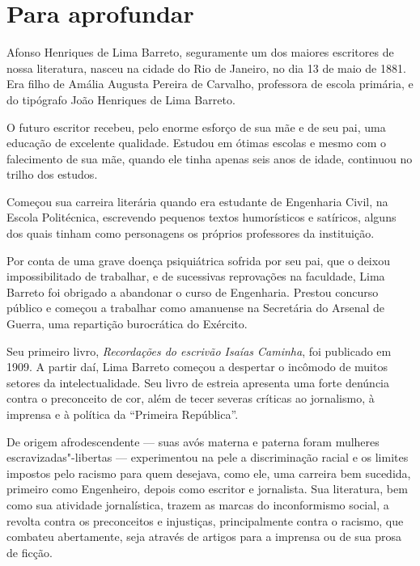 \documentclass{extarticle}
\begin{document}


\section{Para aprofundar}

Afonso Henriques de Lima Barreto, seguramente um dos maiores escritores
de nossa literatura, nasceu na cidade do Rio de Janeiro, no dia 13 de
maio de 1881. Era filho de Amália Augusta Pereira de Carvalho,
professora de escola primária, e do tipógrafo João Henriques de Lima
Barreto.

O futuro escritor recebeu, pelo enorme esforço de sua mãe e de seu pai,
uma educação de excelente qualidade. Estudou em ótimas escolas e mesmo
com o falecimento de sua mãe, quando ele tinha apenas seis anos de
idade, continuou no trilho dos estudos.

Começou sua carreira literária quando era estudante de Engenharia Civil,
na Escola Politécnica, escrevendo pequenos textos humorísticos e
satíricos, alguns dos quais tinham como personagens os próprios
professores da instituição.


Por conta de uma grave doença psiquiátrica sofrida por seu pai, que o
deixou impossibilitado de trabalhar, e de sucessivas reprovações na
faculdade, Lima Barreto foi obrigado a abandonar o curso de Engenharia.
Prestou concurso público e começou a trabalhar como amanuense na
Secretária do Arsenal de Guerra, uma repartição burocrática do Exército.

Seu primeiro livro, \emph{Recordações do escrivão Isaías Caminha}, foi
publicado em 1909. A partir daí, Lima Barreto começou a despertar o
incômodo de muitos setores da intelectualidade. Seu livro de estreia
apresenta uma forte denúncia contra o preconceito de cor, além de tecer
severas críticas ao jornalismo, à imprensa e à política da ``Primeira
República''.

De origem afrodescendente --- suas avós materna e paterna foram mulheres
escravizadas"-libertas --- experimentou na pele a discriminação racial e
os limites impostos pelo racismo para quem desejava, como ele, uma
carreira bem sucedida, primeiro como Engenheiro, depois como escritor e
jornalista. Sua literatura, bem como sua atividade jornalística, trazem
as marcas do inconformismo social, a revolta contra os preconceitos e
injustiças, principalmente contra o racismo, que combateu abertamente,
seja através de artigos para a imprensa ou de sua prosa de ficção.
\end{document}
